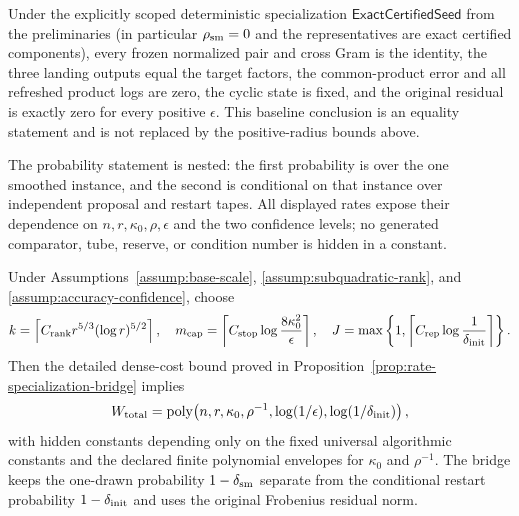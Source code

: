 \begin{theorem}
Under the explicitly scoped deterministic specialization
$\mathsf{ExactCertifiedSeed}$ from the preliminaries (in particular
$\rho_{\rm sm}=0$ and the representatives are exact certified components),
every frozen normalized pair and cross Gram is the identity, the three landing
outputs equal the target factors, the common-product error and all refreshed
product logs are zero, the cyclic state is fixed, and the original residual is
exactly zero for every positive $\epsilon$.  This baseline conclusion is an
equality statement and is not replaced by the positive-radius bounds above.
\end{theorem}

The probability statement is nested: the first probability is over the one
smoothed instance, and the second is conditional on that instance over
independent proposal and restart tapes.  All displayed rates expose their
dependence on $n,r,\kappa _0,\rho,\epsilon$ and the two confidence levels;
no generated comparator, tube, reserve, or condition number is hidden in a
constant.

\begin{corollary}
\label{cor:rate-specialization-bridge}
Under Assumptions~\ref{assump:base-scale},
\ref{assump:subquadratic-rank}, and
\ref{assump:accuracy-confidence}, choose
\[
 k=\left\lceil C_{\rm rank}r^{5/3}(\log r)^{5/2}\right\rceil,
 \quad m_{\rm cap}=\left\lceil C_{\rm stop}\log\frac{8\kappa _0^2}{\epsilon}\right\rceil,
 \quad J=\max\left\{1,\left\lceil C_{\rm rep}\log\frac1{\delta_{\rm init}}\right\rceil\right\}.
\]
Then the detailed dense-cost bound proved in
Proposition~\ref{prop:rate-specialization-bridge} implies
\[
W_{\rm total}=\operatorname{poly}\!\left(n,r,\kappa _0,\rho^{-1},
\log(1/\epsilon),\log(1/\delta_{\rm init})\right),
\]
with hidden constants depending only on the fixed universal algorithmic
constants and the declared finite polynomial envelopes for $\kappa _0$ and
$\rho^{-1}$.  The bridge keeps the one-drawn probability
$1-\delta_{\rm sm}$ separate from the conditional restart probability
$1-\delta_{\rm init}$ and uses the original Frobenius residual norm.
\end{corollary}
